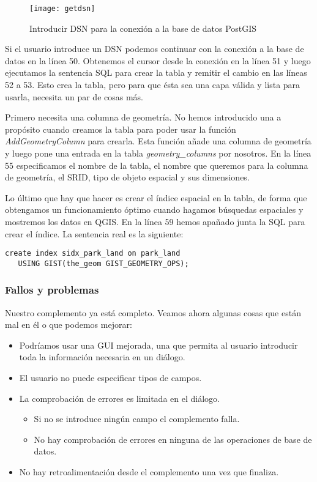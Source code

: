 \begin{figure}[ht]
\begin{center}
  \caption{Introducir DSN para la conexión a la base de datos PostGIS}\label{fig:getdsn}\smallskip
  \texttt{[image: getdsn]}
\end{center}
\end{figure}

Si el usuario introduce un DSN podemos continuar con la conexión a la base de datos en la línea 50. Obtenemos 
el cursor desde la conexión en la línea 51 y luego ejecutamos la sentencia SQL para crear la tabla y remitir 
el cambio en las líneas 52 a 53. Esto crea la tabla, pero para que ésta sea una capa válida y lista para usarla, 
necesita un par de cosas más. 

Primero necesita una columna de geometría. No hemos introducido una a propósito cuando creamos la tabla para 
poder usar la función \textsl{AddGeometryColumn} para crearla. Esta función añade una columna de geometría 
y luego pone una entrada en la tabla \textsl{geometry\_columns} por nosotros. En 
la línea 55 especificamos el 
nombre de la tabla, el nombre que queremos para la columna de geometría, el SRID, tipo de objeto espacial 
y sus dimensiones.

Lo último que hay que hacer es crear el índice espacial en la tabla, de forma que obtengamos un funcionamiento 
óptimo cuando hagamos búsquedas espaciales y mostremos los datos en QGIS. En la línea 59 hemos apañado junta la 
SQL para crear el índice. La sentencia real es la siguiente:

\begin{verbatim}
create index sidx_park_land on park_land 
   USING GIST(the_geom GIST_GEOMETRY_OPS);
\end{verbatim}

\subsubsection{Fallos y problemas}

Nuestro complemento ya está completo. Veamos ahora algunas cosas que están mal en él o que podemos mejorar:

\begin{itemize}
\item Podríamos usar una GUI mejorada, una que permita al usuario introducir toda la información necesaria en un diálogo.
\item El usuario no puede especificar tipos de campos.
\item La comprobación de errores es limitada en el diálogo.
  \begin{itemize}
    \item Si no se introduce ningún campo el complemento falla.
    \item No hay comprobación de errores en ninguna de las operaciones de base de datos.
  \end{itemize} 
\item No hay retroalimentación desde el complemento una vez que finaliza.
\end{itemize} 

